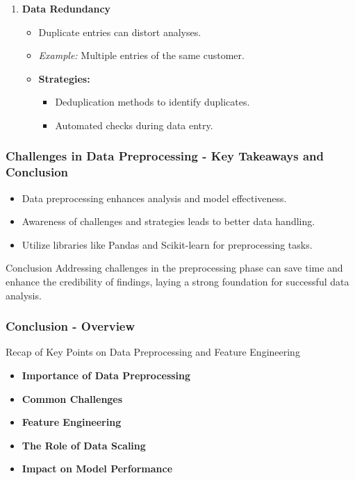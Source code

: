 \documentclass[aspectratio=169]{beamer}
\begin{document}
\begin{frame}[fragile]
\begin{enumerate}[resume]
\begin{itemize}
\begin{itemize}
            \end{itemize}
        \end{itemize}
        \item \textbf{Data Redundancy}
        \begin{itemize}
            \item Duplicate entries can distort analyses.
            \item \textit{Example:} Multiple entries of the same customer.
            \item \textbf{Strategies:}
            \begin{itemize}
                \item Deduplication methods to identify duplicates.
                \item Automated checks during data entry.
            \end{itemize}
        \end{itemize}
    \end{enumerate}
\end{frame}

\begin{frame}[fragile]
    \frametitle{Challenges in Data Preprocessing - Key Takeaways and Conclusion}
    \begin{itemize}
        \item Data preprocessing enhances analysis and model effectiveness.
        \item Awareness of challenges and strategies leads to better data handling.
        \item Utilize libraries like Pandas and Scikit-learn for preprocessing tasks.
    \end{itemize}
    \begin{block}{Conclusion}
        Addressing challenges in the preprocessing phase can save time and enhance the credibility of findings, laying a strong foundation for successful data analysis.
    \end{block}
\end{frame}

\begin{frame}[fragile]
    \frametitle{Conclusion - Overview}
    \begin{block}{Recap of Key Points on Data Preprocessing and Feature Engineering}
        \begin{itemize}
            \item \textbf{Importance of Data Preprocessing}
            \item \textbf{Common Challenges}
            \item \textbf{Feature Engineering}
            \item \textbf{The Role of Data Scaling}
            \item \textbf{Impact on Model Performance}
        \end{itemize}
    \end{block}
\end{frame}
\end{document}
